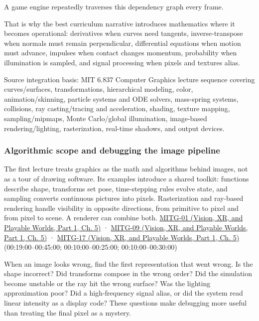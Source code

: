 A game engine repeatedly traverses this dependency graph every frame.

That is why the best curriculum narrative introduces mathematics where it becomes operational: derivatives when curves need tangents, inverse-transpose when normals must remain perpendicular, differential equations when motion must advance, impulses when contact changes momentum, probability when illumination is sampled, and signal processing when pixels and textures alias.

Source integration basis: MIT 6.837 Computer Graphics lecture sequence covering curves/surfaces, transformations, hierarchical modeling, color, animation/skinning, particle systems and ODE solvers, mass-spring systems, collisions, ray casting/tracing and acceleration, shading, texture mapping, sampling/mipmaps, Monte Carlo/global illumination, image-based rendering/lighting, rasterization, real-time shadows, and output devices.

\subsubsection{Algorithmic scope and debugging the image pipeline}\label{03-visual-computing-i-ch001-algorithmic-scope-and-debugging-the-image-pipeline}

\hypertarget{03-visual-computing-i-ch001-algorithmic-scope-and-debugging-the-image-pipeline}{}

The first lecture treats graphics as the math and algorithms behind images, not as a tour of drawing software. Its examples introduce a shared toolkit: functions describe shape, transforms set pose, time-stepping rules evolve state, and sampling converts continuous pictures into pixels. Rasterization and ray-based rendering handle visibility in opposite directions, from primitive to pixel and from pixel to scene. A renderer can combine both. \href{../07-Vision-XR-and-Playable-Worlds-P01/main.pdf\#nameddest=04-visual-computing-ii-ch036-mitg-01---introduction}{MITG-01 (Vision, XR, and Playable Worlds, Part 1, Ch. 5)} · \href{../07-Vision-XR-and-Playable-Worlds-P01/main.pdf\#nameddest=04-visual-computing-ii-ch036-mitg-09---ray-casting}{MITG-09 (Vision, XR, and Playable Worlds, Part 1, Ch. 5)} · \href{../07-Vision-XR-and-Playable-Worlds-P01/main.pdf\#nameddest=04-visual-computing-ii-ch036-mitg-17---rasterization}{MITG-17 (Vision, XR, and Playable Worlds, Part 1, Ch. 5)} (00:19:00--00:45:00; 00:10:00--00:25:00; 00:10:00--00:30:00)

When an image looks wrong, find the first representation that went wrong. Is the shape incorrect? Did transforms compose in the wrong order? Did the simulation become unstable or the ray hit the wrong surface? Was the lighting approximation poor? Did a high-frequency signal alias, or did the system read linear intensity as a display code? These questions make debugging more useful than treating the final pixel as a mystery.

